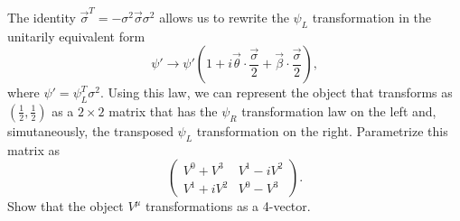 \begin{problembody}
    \item The identity $\vec{\sigma}^T = -\sigma^2 \vec{\sigma}\sigma^2$ allows us to rewrite the $\psi_L$ transformation in the 
    unitarily equivalent form
    \begin{equation*}
        \psi' \to \psi' \left(1 + i\vec{\theta}\cdot\frac{\vec{\sigma}}{2} + \vec{\beta}\cdot\frac{\vec{\sigma}}{2}\right),
    \end{equation*}
    where $\psi' = \psi_L^T \sigma^2$. Using this law, we can represent the object that transforms as $(\frac{1}{2}, \frac{1}{2})$
    as a $2 \times 2$ matrix that has the $\psi_R$ transformation law on the left and, simutaneously, the transposed $\psi_L$ transformation
    on the right. Parametrize this matrix as
    \begin{equation*}
        \begin{pmatrix}
            V^0 + V^3  & V^1 - iV^2 \\
            V^1 + iV^2 & V^0 - V^3
        \end{pmatrix}.
    \end{equation*}
    Show that the object $V^\mu$ transformations as a 4-vector.
\end{problembody}

